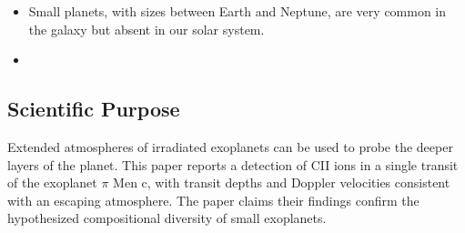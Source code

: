 \documentclass[onecolumn]{aastex63}
\begin{document}
\begin{itemize}
    \item Small planets, with sizes between Earth and Neptune, are very common in the galaxy but absent in our solar system. 
    \item 
\end{itemize}

\subsection{Scientific Purpose}

Extended atmospheres of irradiated exoplanets can be used to probe the deeper layers of the planet. This paper reports a detection of CII ions in a single transit of the exoplanet $\pi$ Men c, with transit depths and Doppler velocities consistent with an escaping atmosphere. The paper claims their findings confirm the hypothesized compositional diversity of small exoplanets.





\end{document}
